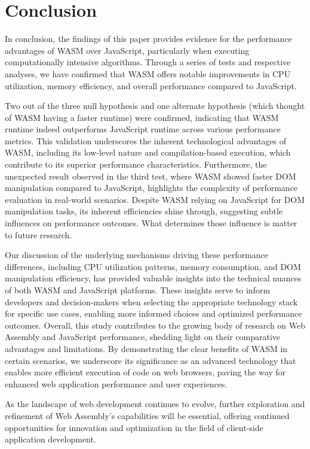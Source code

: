 \newpage
\section{Conclusion} \label{conclusion}
In conclusion, the findings of this paper provides evidence for the performance advantages of WASM over JavaScript, particularly when executing computationally intensive algorithms. Through a series of tests and respective analyses, we have confirmed that WASM offers notable improvements in CPU utilization, memory efficiency, and overall performance compared to JavaScript.

Two out of the three null hypothesis and one alternate hypothesis (which thought of WASM having a faster runtime) were confirmed, indicating that WASM runtime indeed outperforms JavaScript runtime across various performance metrics. This validation underscores the inherent technological advantages of WASM, including its low-level nature and compilation-based execution, which contribute to its superior performance characteristics. Furthermore, the unexpected result observed in the third test, where WASM showed faster DOM manipulation compared to JavaScript, highlights the complexity of performance evaluation in real-world scenarios. Despite WASM relying on JavaScript for DOM manipulation tasks, its inherent efficiencies shine through, suggesting subtle influences on performance outcomes. What determines those influence is matter to future research.

Our discussion of the underlying mechanisms driving these performance differences, including CPU utilization patterns, memory consumption, and DOM manipulation efficiency, has provided valuable insights into the technical nuances of both WASM and JavaScript platforms. These insights serve to inform developers and decision-makers when selecting the appropriate technology stack for specific use cases, enabling more informed choices and optimized performance outcomes. Overall, this study contributes to the growing body of research on Web Assembly and JavaScript performance, shedding light on their comparative advantages and limitations. By demonstrating the clear benefits of WASM in certain scenarios, we underscore its significance as an advanced technology that enables more efficient execution of code on web browsers, paving the way for enhanced web application performance and user experiences.

As the landscape of web development continues to evolve, further exploration and refinement of Web Assembly's capabilities will be essential, offering continued opportunities for innovation and optimization in the field of client-side application development.